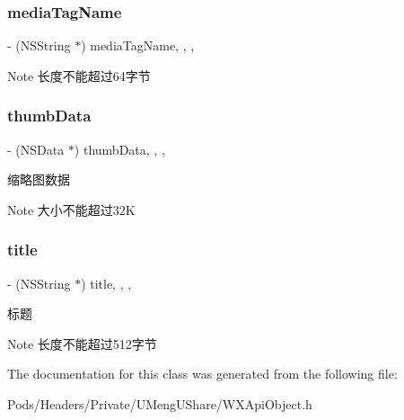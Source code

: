 \subsubsection{\texorpdfstring{media\+Tag\+Name}{mediaTagName}}
{\footnotesize\ttfamily -\/ (N\+S\+String $\ast$) media\+Tag\+Name\hspace{0.3cm}{\ttfamily [read]}, {\ttfamily [write]}, {\ttfamily [nonatomic]}, {\ttfamily [retain]}}

\begin{DoxyNote}{Note}
长度不能超过64字节 
\end{DoxyNote}
\mbox{\label{interface_w_x_media_message_a1dcd0ea41ad61fe428df6dcf2a206fcb}} 
\subsubsection{\texorpdfstring{thumb\+Data}{thumbData}}
{\footnotesize\ttfamily -\/ (N\+S\+Data $\ast$) thumb\+Data\hspace{0.3cm}{\ttfamily [read]}, {\ttfamily [write]}, {\ttfamily [nonatomic]}, {\ttfamily [retain]}}

缩略图数据 \begin{DoxyNote}{Note}
大小不能超过32K 
\end{DoxyNote}
\mbox{\label{interface_w_x_media_message_ad2fe805228158ccc9c926f4708f496f5}} 
\subsubsection{\texorpdfstring{title}{title}}
{\footnotesize\ttfamily -\/ (N\+S\+String $\ast$) title\hspace{0.3cm}{\ttfamily [read]}, {\ttfamily [write]}, {\ttfamily [nonatomic]}, {\ttfamily [retain]}}

标题 \begin{DoxyNote}{Note}
长度不能超过512字节 
\end{DoxyNote}


The documentation for this class was generated from the following file\+:\begin{DoxyCompactItemize}
\item 
Pods/\+Headers/\+Private/\+U\+Meng\+U\+Share/W\+X\+Api\+Object.\+h\end{DoxyCompactItemize}
